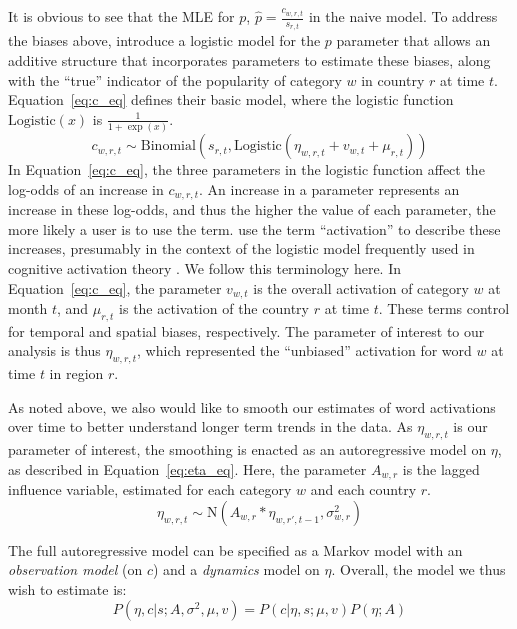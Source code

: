 It is obvious to see that the MLE for $p$, $\hat{p} = \frac{c_{w,r,t}}{s_{r,t}}$ in the naive model.  To address the biases above, \cite{eisenstein_diffusion_2014} introduce a logistic model for the $p$ parameter that allows an additive structure that incorporates  parameters to estimate these biases, along with the ``true'' indicator of the popularity of category $w$ in country $r$ at time $t$. Equation~\ref{eq:c_eq} defines their basic model, where the logistic function $\text{Logistic}(x)$ is $\frac{1}{1 + \exp(x)}$.
\begin{equation}
	c_{w,r,t} \sim \mathrm{Binomial}(s_{r,t}, \mathrm{Logistic}(\eta_{w,r,t} + v_{w,t} + \mu_{r,t})) \label{eq:c_eq} 
\end{equation}
In Equation~\ref{eq:c_eq}, the three parameters in the logistic function affect the log-odds of an increase in $c_{w,r,t}$.  An increase in a parameter represents an increase in these log-odds, and thus the higher the value of each parameter, the more likely a user is to use the term.  \cite{eisenstein_diffusion_2014} use the term ``activation'' to describe these increases, presumably in the context of the logistic model frequently used in cognitive activation theory \citep{anderson_act-r:_1997}. We follow this terminology here.  In Equation~\ref{eq:c_eq}, the parameter $v_{w,t}$ is the overall activation of category $w$ at month $t$, and $\mu_{r,t}$ is the activation of the country $r$ at time $t$.  These terms control for temporal and spatial biases, respectively.  The parameter of interest to our analysis is thus $\eta_{w,r,t}$, which represented the ``unbiased'' activation for word $w$ at time $t$ in region $r$. 

As noted above, we also would like to smooth our estimates of word activations over time to better understand longer term trends in the data. As $\eta_{w,r,t}$ is our parameter of interest, the smoothing is enacted as an autoregressive model on $\eta$, as described in Equation~\ref{eq:eta_eq}. Here, the parameter $A_{w,r}$ is the lagged influence variable, estimated for each category $w$ and each country $r$.
\begin{equation}
	\eta_{w,r,t} \sim \mathrm{N}( A_{w,r}*\eta_{w,r',t-1}, \sigma^2_{w,r}) \label{eq:eta_eq}
\end{equation}

The full autoregressive model can be specified as a Markov model with an \emph{observation model} (on $c$) and a \emph{dynamics}  model on $\eta$. Overall, the model we thus wish to estimate is:
\begin{equation}
	P(\eta,c|s; A, \sigma^2,\mu,v) = P(c | \eta, s; \mu, v) P(\eta; A)
\end{equation}

